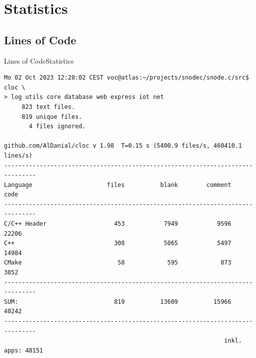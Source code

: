 ﻿\section{Statistics}
\subsection{Lines of Code}

\begin{frame}[fragile] {Lines of Code}{Statistics}
\begin{center}
  \begin{BVerbatim}[fontsize=\small]
Mo 02 Oct 2023 12:28:02 CEST voc@atlas:~/projects/snodec/snode.c/src$ cloc \
> log utils core database web express iot net
     823 text files.
     819 unique files.
       4 files ignored.

github.com/AlDanial/cloc v 1.98  T=0.15 s (5400.9 files/s, 460410.1 lines/s)
-------------------------------------------------------------------------------
Language                     files          blank        comment           code
-------------------------------------------------------------------------------
C/C++ Header                   453           7949           9596          22206
C++                            308           5065           5497          14984
CMake                           58            595            873           3052
-------------------------------------------------------------------------------
SUM:                           819          13609          15966          40242
-------------------------------------------------------------------------------
                                                              inkl. apps: 48151
  \end{BVerbatim}
\end{center}
\end{frame}
